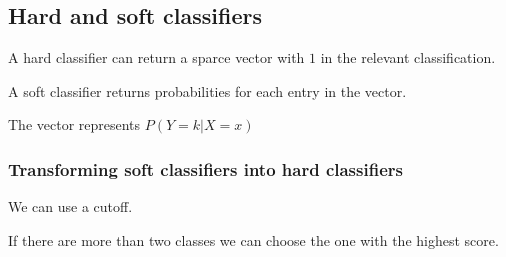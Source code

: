 
\subsection{Hard and soft classifiers}

A hard classifier can return a sparce vector with \(1\) in the relevant classification.

A soft classifier returns probabilities for each entry in the vector.

The vector represents  \(P(Y=k|X=x)\)

\subsubsection{Transforming soft classifiers into hard classifiers}

We can use a cutoff.

If there are more than two classes we can choose the one with the highest score.

